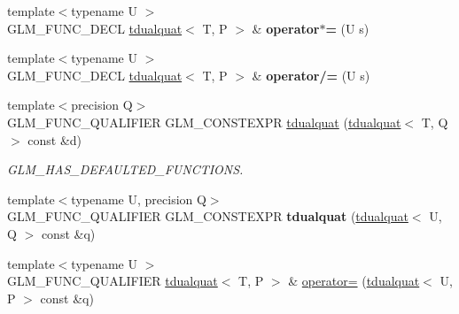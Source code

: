 \begin{DoxyCompactItemize}
\item 
\mbox{\label{structglm_1_1tdualquat_a2ca62c45a69cd875c2d265543ddbd2de}} 
{\footnotesize template$<$typename U $>$ }\\G\+L\+M\+\_\+\+F\+U\+N\+C\+\_\+\+D\+E\+CL \hyperlink{structglm_1_1tdualquat}{tdualquat}$<$ T, P $>$ \& {\bfseries operator$\ast$=} (U s)
\item 
\mbox{\label{structglm_1_1tdualquat_ab4cdb5a086d64909be52d436bd05ec11}} 
{\footnotesize template$<$typename U $>$ }\\G\+L\+M\+\_\+\+F\+U\+N\+C\+\_\+\+D\+E\+CL \hyperlink{structglm_1_1tdualquat}{tdualquat}$<$ T, P $>$ \& {\bfseries operator/=} (U s)
\item 
\mbox{\label{structglm_1_1tdualquat_a9cf5d2c303cd089e7a87d72172ea827e}} 
{\footnotesize template$<$precision Q$>$ }\\G\+L\+M\+\_\+\+F\+U\+N\+C\+\_\+\+Q\+U\+A\+L\+I\+F\+I\+ER G\+L\+M\+\_\+\+C\+O\+N\+S\+T\+E\+X\+PR \hyperlink{structglm_1_1tdualquat_a9cf5d2c303cd089e7a87d72172ea827e}{tdualquat} (\hyperlink{structglm_1_1tdualquat}{tdualquat}$<$ T, Q $>$ const \&d)
\begin{DoxyCompactList}\small\item\em G\+L\+M\+\_\+\+H\+A\+S\+\_\+\+D\+E\+F\+A\+U\+L\+T\+E\+D\+\_\+\+F\+U\+N\+C\+T\+I\+O\+NS. \end{DoxyCompactList}\item 
\mbox{\label{structglm_1_1tdualquat_a7a1546841d7a1b2bc12a5bfa65c625e8}} 
{\footnotesize template$<$typename U, precision Q$>$ }\\G\+L\+M\+\_\+\+F\+U\+N\+C\+\_\+\+Q\+U\+A\+L\+I\+F\+I\+ER G\+L\+M\+\_\+\+C\+O\+N\+S\+T\+E\+X\+PR {\bfseries tdualquat} (\hyperlink{structglm_1_1tdualquat}{tdualquat}$<$ U, Q $>$ const \&q)
\item 
\mbox{\label{structglm_1_1tdualquat_a4c6247ec39b3e82e5224988ec4312c77}} 
{\footnotesize template$<$typename U $>$ }\\G\+L\+M\+\_\+\+F\+U\+N\+C\+\_\+\+Q\+U\+A\+L\+I\+F\+I\+ER \hyperlink{structglm_1_1tdualquat}{tdualquat}$<$ T, P $>$ \& \hyperlink{structglm_1_1tdualquat_a4c6247ec39b3e82e5224988ec4312c77}{operator=} (\hyperlink{structglm_1_1tdualquat}{tdualquat}$<$ U, P $>$ const \&q)

\end{DoxyCompactItemize}
